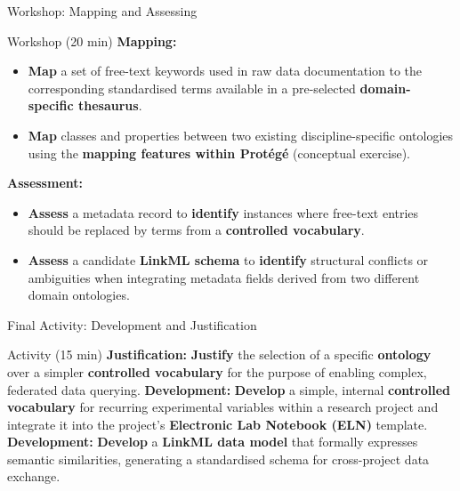\documentclass{integrity} %
\begin{document}
\begin{frame}{Workshop: Mapping and Assessing}
    \begin{block}{Workshop (20 min)}
        \textbf{Mapping:}
        \begin{itemize}
            \item \textbf{Map} a set of free-text keywords used in raw data documentation to the corresponding standardised terms available in a pre-selected \textbf{domain-specific thesaurus}.
            \item \textbf{Map} classes and properties between two existing discipline-specific ontologies using the \textbf{mapping features within Protégé} (conceptual exercise).
        \end{itemize}
        \pause
        \textbf{Assessment:}
        \begin{itemize}
            \item \textbf{Assess} a metadata record to \textbf{identify} instances where free-text entries should be replaced by terms from a \textbf{controlled vocabulary}.
            \item \textbf{Assess} a candidate \textbf{LinkML schema} to \textbf{identify} structural conflicts or ambiguities when integrating metadata fields derived from two different domain ontologies.
        \end{itemize}
    \end{block}
\end{frame}

\begin{frame}{Final Activity: Development and Justification}
    \begin{block}{Activity (15 min)}
        \textbf{Justification:} \textbf{Justify} the selection of a specific \textbf{ontology} over a simpler \textbf{controlled vocabulary} for the purpose of enabling complex, federated data querying.
        \pause
        \textbf{Development:} \textbf{Develop} a simple, internal \textbf{controlled vocabulary} for recurring experimental variables within a research project and integrate it into the project's \textbf{Electronic Lab Notebook (ELN)} template.
        \pause
        \textbf{Development:} \textbf{Develop} a \textbf{LinkML data model} that formally expresses semantic similarities, generating a standardised schema for cross-project data exchange.
    \end{block}
\end{frame}

\end{document}
